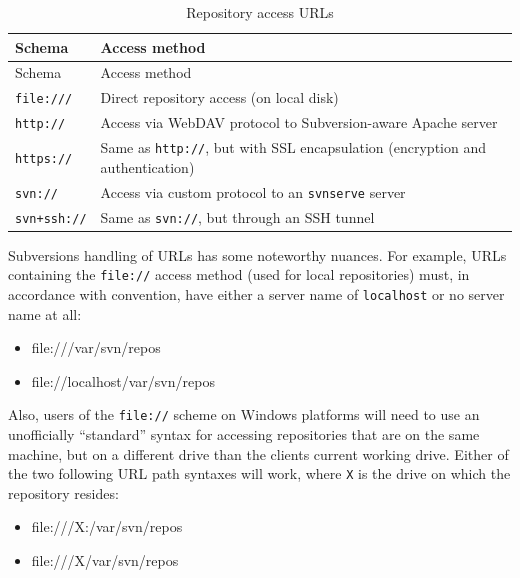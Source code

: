 \begin{longtable}[]{@{}>{\raggedright\arraybackslash}p{}>{\raggedright\arraybackslash}p{}@{}}
\caption{Repository access
URLs}\label{svn.basic.in-action.wc.tbl-1}\tabularnewline
\toprule\noalign{}
Schema & Access method \\
\midrule\noalign{}
\endfirsthead
\toprule\noalign{}
Schema & Access method \\
\midrule\noalign{}
\endhead
\bottomrule\noalign{}
\endlastfoot
\texttt{file:///} & Direct repository access (on local disk) \\
\texttt{http://} & Access via WebDAV protocol to Subversion-aware Apache
server \\
\texttt{https://} & Same as \texttt{http://}, but with SSL encapsulation
(encryption and authentication) \\
\texttt{svn://} & Access via custom protocol to an \texttt{svnserve}
server \\
\texttt{svn+ssh://} & Same as \texttt{svn://}, but through an SSH
tunnel \\
\end{longtable}

Subversion\textquotesingle s handling of URLs has some noteworthy
nuances. For example, URLs containing the \texttt{file://} access method
(used for local repositories) must, in accordance with convention, have
either a server name of \texttt{localhost} or no server name at all:

\begin{itemize}
\tightlist
\item
  file:///var/svn/repos
\item
  file://localhost/var/svn/repos
\end{itemize}

Also, users of the \texttt{file://} scheme on Windows platforms will
need to use an unofficially ``standard'' syntax for accessing
repositories that are on the same machine, but on a different drive than
the client\textquotesingle s current working drive. Either of the two
following URL path syntaxes will work, where \texttt{X} is the drive on
which the repository resides:

\begin{itemize}
\tightlist
\item
  file:///X:/var/svn/repos
\item
  file:///X\textbar/var/svn/repos
\end{itemize}

